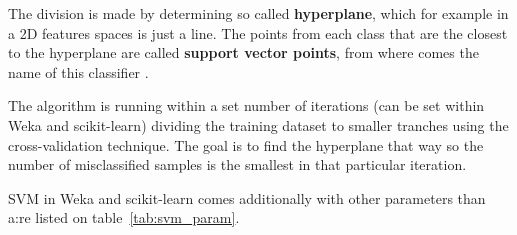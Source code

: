 The division is made by determining so called \textbf{hyperplane}, which for example in a 2D features spaces is just a line. The points from each class that are the closest to the hyperplane are called \textbf{support vector points}, from where comes the name of this classifier \cite{yadav_support_2018} \cite{noauthor_support_2014}. 

The algorithm is running within a set number of iterations (can be set within Weka and scikit-learn) dividing the training dataset to smaller tranches using the cross-validation technique. The goal is to find the hyperplane that way so the number of misclassified samples is the smallest in that particular iteration. 

SVM in Weka and scikit-learn comes additionally with other parameters than a:re listed on table~\ref{tab:svm_param}.

